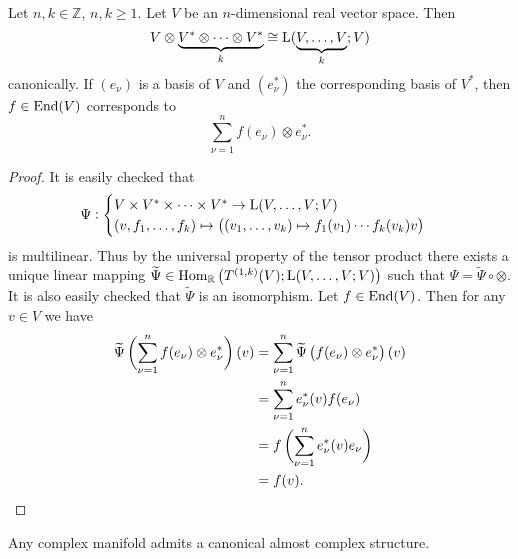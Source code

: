 \begin{lemma}
Let $n,k \in \mathbb{Z}$, $n,k \geq 1$. Let $V$ be an $n$-dimensional real vector space. Then
\begin{equation}
V \otimes \underbrace{V^* \otimes \dots \otimes V^*}_{k} \cong \mathrm{L}(\underbrace{V,\dots,V}_{k};V)
\end{equation}
\noindent canonically. If $(e_\nu)$ is a basis of $V$ and $(e_\nu^*)$ the corresponding basis of $V^*$, then $f \in \operatorname{End}(V)$ corresponds to
\begin{equation}
\sum_{\nu = 1}^n f(e_\nu) \otimes e_\nu^*.
\end{equation}
\label{lem:corr}
\end{lemma}

\begin{proof}
It is easily checked that
\begin{equation*}
\Psi:\begin{cases} 
V \times V^* \times \dots \times V^* \to \Lup(V,\dots,V;V)\\
(v,f_1,\dots,f_k) \mapsto \del[1]{(v_1,\dots,v_k) \mapsto f_1(v_1)\cdots f_k(v_k)v}
\end{cases}
\end{equation*}
\noindent is multilinear. Thus by the universal property of the tensor product there exists a unique linear mapping $\widetilde{\Psi} \in \Hom_\mathbb{R}\del[1]{T^{(1,k)}(V); \Lup(V,\dots,V;V)}$ such that $\Psi = \widetilde{\Psi} \circ \otimes$. It is also easily checked that $\widetilde{\Psi}$ is an isomorphism. Let $f \in \operatorname{End}(V)$. Then for any $v \in V$ we have
\begin{align*}
\widetilde{\Psi}\del[3]{\sum_{\nu = 1}^n f(e_\nu) \otimes e_\nu^*}(v) &= \sum_{\nu = 1}^n \widetilde{\Psi}\del[1]{f(e_\nu) \otimes e_\nu^*}(v)\\
&= \sum_{\nu = 1}^n e_\nu^*(v)f(e_\nu)\\
&= f\del[3]{\sum_{\nu = 1}^n e_\nu^*(v)e_\nu}\\
&= f(v).
\end{align*}
\end{proof}

\begin{proposition}
Any complex manifold admits a canonical almost complex structure.
\label{prop:complex_is_almost}
\end{proposition}

